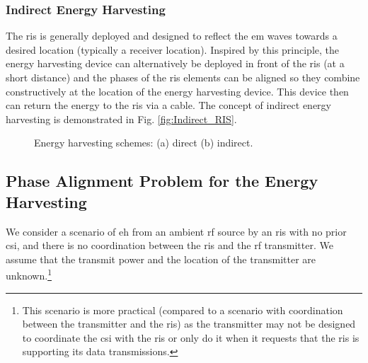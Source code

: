 \documentclass[conference]{IEEEtran}
\begin{document}
\subsubsection{Indirect Energy Harvesting}
The \gls*{ris} is generally deployed and designed to reflect the \gls*{em} waves towards a desired location (typically a receiver location). Inspired by this principle, the energy harvesting device can alternatively be deployed in front of the \gls*{ris} (at a short distance) and the phases of the \gls*{ris} elements can be aligned so they combine constructively at the location of the energy harvesting device. This device then can return the energy to the \gls*{ris} via a cable. The concept of indirect energy harvesting is demonstrated in Fig. \ref{fig:Indirect_RIS}.


\begin{figure}[!t]
          \centering
          \hspace{-17mm}
          \subfloat[]{\scalebox{0.67}{}%
              \label{fig:direct_RIS}}
          \hfil
          \hspace{-5mm}
          \subfloat[]{\scalebox{0.67}{}%
             \label{fig:Indirect_RIS}}
          \caption{Energy harvesting schemes: (a) direct (b) indirect.}
          \label{fig:direct_Indirect_RIS}
\end{figure}



\subsection{Phase Alignment Problem for the Energy Harvesting}
We consider a scenario of \gls*{eh} from an ambient \gls*{rf} source by an \gls*{ris} with no prior  \gls*{csi}, and there is no coordination between the \gls*{ris} and the \gls*{rf} transmitter. We assume that the transmit power and the location of the transmitter are unknown.\footnote{This scenario is more practical (compared to a scenario with coordination between the transmitter and the \gls*{ris}) as the transmitter may not be designed to coordinate the \gls*{csi} with the \gls*{ris} or only do it when it requests that the \gls*{ris} is supporting its data transmissions.}
\end{document}
